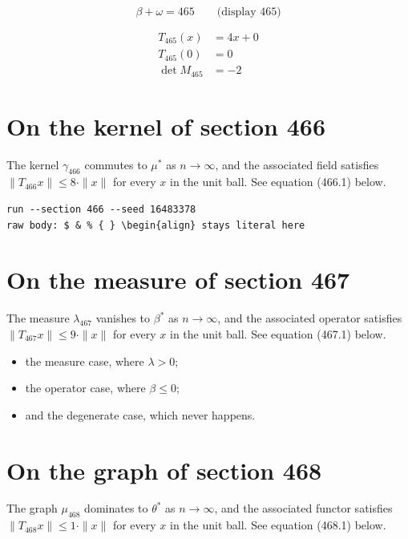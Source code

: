 \documentclass{article}
\begin{document}
$$
\beta + \omega = 465 \qquad \text{(display 465)}
$$

\begin{align}
T_{465}(x) &= 4 x + 0 \\
T_{465}(0) &= 0 \\
\det M_{465} &= -2
\end{align}

\section{On the kernel of section 466}
The kernel $\gamma_{466}$ commutes to $\mu^{*}$ as $n \to \infty$,
and the associated field satisfies $\|T_{466} x\| \leq 8 \cdot \|x\|$
for every $x$ in the unit ball. See equation (466.1) below.

\begin{verbatim}
run --section 466 --seed 16483378
raw body: $ & % { } \begin{align} stays literal here
\end{verbatim}

\section{On the measure of section 467}
The measure $\lambda_{467}$ vanishes to $\beta^{*}$ as $n \to \infty$,
and the associated operator satisfies $\|T_{467} x\| \leq 9 \cdot \|x\|$
for every $x$ in the unit ball. See equation (467.1) below.

\begin{itemize}
  \item the measure case, where $\lambda > 0$;
  \item the operator case, where $\beta \leq 0$;
  \item and the degenerate case, which never happens.
\end{itemize}

\section{On the graph of section 468}
The graph $\mu_{468}$ dominates to $\theta^{*}$ as $n \to \infty$,
and the associated functor satisfies $\|T_{468} x\| \leq 1 \cdot \|x\|$
for every $x$ in the unit ball. See equation (468.1) below.
\end{document}
